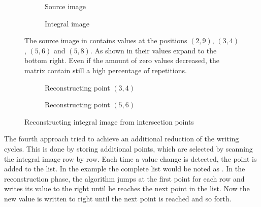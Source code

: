 \begin{figure}
\begin{subfigure}{.5\textwidth}
    
    \caption{Source image}
    \label{fig:integral_image_interference:source_image}
\end{subfigure}%
\begin{subfigure}{.5\textwidth}
    
    \caption{Integral image}
    \label{fig:integral_image_interference:integral_image}
\end{subfigure}%
\caption[Creation of an integral image]{The source image in  contains values at the positions $(2,9)$, $(3,4)$, $(5,6)$ and $(5,8)$. As shown in  their values expand to the bottom right. Even if the amount of zero values decreased, the matrix contain still a high percentage of repetitions.}
\label{fig:integral_image_interference}
\end{figure}

\begin{figure}
\begin{subfigure}{.5\textwidth}
    
    \caption{Reconstructing point $(3,4)$}
    \label{fig:integral_image_interference2:point1}
\end{subfigure}%
\begin{subfigure}{.5\textwidth}
    
    \caption{Reconstructing point $(5,6)$}
    \label{fig:integral_image_interference2:point2}
\end{subfigure}%
\caption{Reconstructing integral image from intersection points}
\label{fig:integral_image_interference2}
\end{figure}

The fourth approach tried to achieve an additional reduction of the writing cycles. This is done by storing additional points, which are selected by scanning the integral image row by row. Each time a value change is detected, the point is added to the list. In the example the complete list would be noted as . In the reconstruction phase, the algorithm jumps at the first point for each row and writes its value to the right until he reaches the next point in the list. Now the new value is written to right until the next point is reached and so forth.

